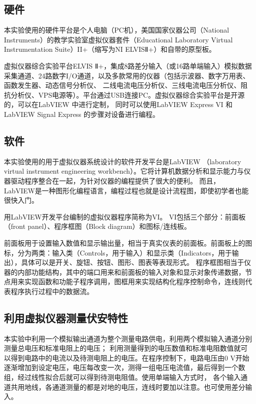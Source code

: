 \documentclass[12pt,a4paper]{article}
\begin{document}
    \subsection{硬件}
本实验使用的硬件平台是个人电脑（PC机），美国国家仪器公司（National Instruments）的教学实验室虚拟仪器套件（Educational Laboratory Virtual Instrumentation Suite）II+（缩写为NI ELVISⅡ+）和自带的原型板。\par
虚拟仪器综合实验平台ELVIS Ⅱ+，集成8路差分输入（或16路单端输入）模拟数据采集通道、24路数字I/O通道，以及多款常用的仪器（包括示波器、数字万用表、函数发生器、动态信号分析仪、
二线电流电压分析仪、三线电流电压分析仪、阻抗分析仪、VPS电源等）。平台通过USB连接PC。虚拟仪器综合实验平台是开源的，可以在LabVIEW 中进行定制，
同时可以使用LabVIEW Express VI 和LabVIEW Signal Express 的步骤对设备进行编程。\par
    \subsection{软件}
本实验使用的用于虚拟仪器系统设计的软件开发平台是LabVIEW （laboratory virtual instrument engineering workbench）。它将计算机数据分析和显示能力与仪器驱动程序整合在一起，为针对仪器的编程提供了很大的便利。
而且， LabVIEW是一种图形化编程语言，编程过程也就是设计流程图，即使初学者也能很快入门。\par
用LabVIEW开发平台编制的虚拟仪器程序简称为VI。 VI包括三个部分：前面板（front panel）、程序框图（Block diagram）和图标/连线板。\par
前面板用于设置输入数值和显示输出量，相当于真实仪表的前面板。前面板上的图标，分为两类：输入类（Controls，用于输入）和显示类（Indicators，用于输出），具体可以是开关、旋钮、按钮、图形、图表等表现形式。
程序框图相当于仪器的内部功能结构，其中的端口用来和前面板的输入对象和显示对象传递数据，节点用来实现函数和功能子程序调用，图框用来实现结构化程序控制命令，连线则代表程序执行过程中的数据流。\par
    \subsection{利用虚拟仪器测量伏安特性}
本实验中利用一个模拟输出通道为整个测量电路供电，利用两个模拟输入通道分别测量总电压和标准电阻上的电压；
利用测量得到的电压数值和标准电阻数值就可以得到电路中的电流以及待测电阻上的电压。在程序控制下，电路电压由0 V开始逐渐增加到设定电压，电压每改变一次，测得一组电压电流值，最后得到一个数组，经过线性拟合后就可以得到待测电阻值。使用单端输入方式时，
各个输入通道共用地线，各通道测量的都是对地的电压，连线时要加以注意。也可使用差分输入。
\end{document}
